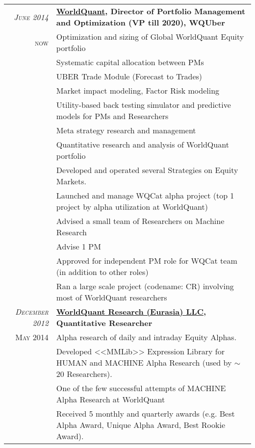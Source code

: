 \documentclass[unicode,a4paper,10pt]{article}
\begin{document}
\begin{tabular}{r p{13cm}}

 \emph{\textsc{June 2014}} & \textbf{\href{https://www.worldquant.com/}{WorldQuant}, Director of Portfolio Management and Optimization (VP till 2020), WQUber} \\
\textsc{now}
&\footnotesize{Optimization and sizing of Global WorldQuant Equity portfolio}\\
&\footnotesize{Systematic capital allocation between PMs}\\
&\footnotesize{UBER Trade Module (Forecast to Trades)}\\
&\footnotesize{Market impact modeling, Factor Risk modeling}\\
&\footnotesize{Utility-based back testing simulator and predictive models for PMs and Researchers}\\
&\footnotesize{Meta strategy research and management}\\
&\footnotesize{Quantitative research and analysis of WorldQuant portfolio}\\
&\footnotesize{Developed and operated several Strategies on Equity Markets.}\\
&\footnotesize{Launched and manage WQCat alpha project (top 1 project by alpha utilization at WorldQuant)} \\
&\footnotesize{Advised a small team of Researchers on Machine Research}\\
&\footnotesize{Advise 1 PM}\\
&\footnotesize{Approved for independent PM role for WQCat team (in addition to other roles)}\\
&\footnotesize{Ran a large scale project (codename: CR) involving most of WorldQuant researchers}\\


 \emph{\textsc{December 2012}} & \textbf{\href{https://www.worldquant.com/}{WorldQuant Research (Eurasia) LLC}, Quantitative Researcher} \\
\textsc{May 2014}
&\footnotesize{Alpha research of daily and intraday Equity Alphas.}\\
&\footnotesize{Developed <<MMLib>> Expression Library for HUMAN and MACHINE Alpha Research (used by $\sim$20 Researchers).}\\
&\footnotesize{One of the few successful attempts of MACHINE Alpha Research at WorldQuant}\\
&\footnotesize{Received 5 monthly and quarterly awards (e.g. Best Alpha Award, Unique Alpha Award, Best Rookie Award).}\\



\end{tabular}
\end{document}

